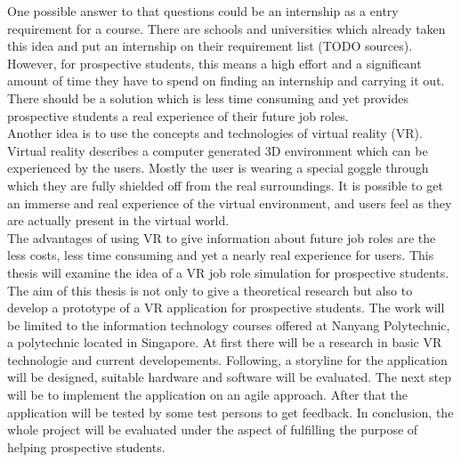 One possible answer to that questions could be an internship as a entry requirement for a course. There are schools and universities which already taken this idea and put an internship on their requirement list (TODO sources). However, for prospective students, this means a high effort and a significant amount of time they have to spend on finding an internship and carrying it out. There should be a solution which is less time consuming and yet provides prospective students a real experience of their future job roles.\\
Another idea is to use the concepts and technologies of virtual reality (VR). Virtual reality describes a computer generated 3D environment which can be experienced by the users. Mostly the user is wearing a special goggle through which they are fully shielded off from the real surroundings. It is possible to get an immerse and real experience of the virtual environment, and users feel as they are actually present in the virtual world. \cite{Linowes.2015}\\
The advantages of using VR to give information about future job roles are the less costs, less time consuming and yet a nearly real experience for users. This thesis will examine the idea of a VR job role simulation for prospective students. The aim of this thesis is not only to give a theoretical research but also to develop a prototype of a VR application for prospective students. The work will be limited to the information technology courses offered at Nanyang Polytechnic, a polytechnic located in Singapore. At first there will be a  research in basic VR technologie and current developements. Following, a storyline for the application will be designed, suitable hardware and software will be evaluated. The next step will be to implement the application on an agile approach. After that the application will be tested by some test persons to get feedback. In conclusion, the whole project will be evaluated under the aspect of fulfilling the purpose of helping prospective students.

